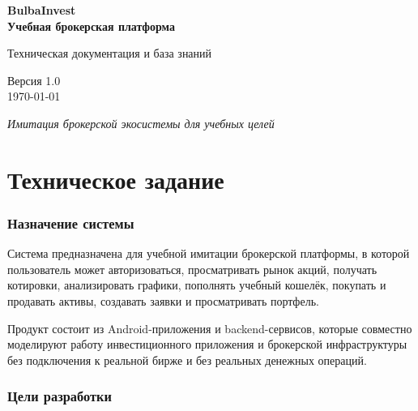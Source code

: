 \documentclass[12pt,a4paper]{article}
\begin{document}
\begin{titlepage}
\centering
\vspace*{4cm}

{\Huge\bfseries BulbaInvest\\[0.5cm]
\large Учебная брокерская платформа}

\vspace{1.5cm}

{\Large Техническая документация и база знаний}

\vspace{1cm}

{\large Версия 1.0\\[0.3cm]
\today}

\vfill

{\itshape Имитация брокерской экосистемы для учебных целей}
\end{titlepage}

\tableofcontents
\newpage

\part{Техническое задание}

\section{Назначение системы}

Система предназначена для учебной имитации брокерской платформы, в которой
пользователь может авторизоваться, просматривать рынок акций, получать котировки,
анализировать графики, пополнять учебный кошелёк, покупать и продавать активы,
создавать заявки и просматривать портфель.

Продукт состоит из Android-приложения и backend-сервисов, которые совместно
моделируют работу инвестиционного приложения и брокерской инфраструктуры без
подключения к реальной бирже и без реальных денежных операций.

\section{Цели разработки}
\end{document}
